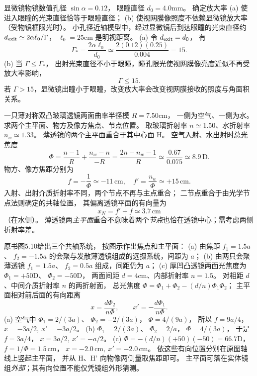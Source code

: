 显微镜物镜数值孔径
$\sin\alpha=0.12$，
眼瞳直径
$d_0=4.0$mm。
确定放大率
(a) 使进入眼瞳的光束直径恰等于眼瞳直径；
(b) 使视网膜像照度不依赖显微镜放大率（受物镜框限光时）。
\exsolution
小孔径近轴模型中，经过显微镜后到达眼瞳的光束直径约
$d_{\rm exit}\simeq2\alpha\ell_0/\Gamma$，
$\ell_0=25$cm 是明视距离。
(a) 令
$d_{\rm exit}=d_0$，
有
\[
\boxed{\Gamma_*=\frac{2\alpha\ell_0}{d_0}
\simeq\frac{2(0.12)(0.25)}{0.004}
=15}.
\]
(b) 当 $\Gamma\le\Gamma_*$，
出射光束直径不小于眼瞳，瞳孔限光使视网膜像亮度近似不再受放大率影响，
\[
\boxed{\Gamma\le15}.
\]
\excheck 若 $\Gamma>15$，显微镜出瞳小于眼瞳，改变放大率会改变视网膜接收的照度与角面积关系。

一只薄对称双凸玻璃透镜两面曲率半径模
$R=7.50$cm，
一侧为空气、一侧为水。
求两个主平面、物方及像方焦点、节点位置。
取玻璃折射率 $n\simeq1.50$、水折射率
$n_w\simeq1.33$。
\exsolution
薄透镜的两个主平面重合于其中心面 H。
空气入射、水出射时总光焦度
\[
\Phi=\frac{n-1}R+\frac{n_w-n}{-R}
=\frac{2n-n_w-1}{R}
\simeq\frac{0.67}{0.075}
\simeq8.9\,\mathrm D.
\]
物方、像方焦距分别为
\[
\boxed{f=-\frac1\Phi\simeq-11\,\mathrm{cm}},
\quad
\boxed{f'=\frac{n_w}{\Phi}\simeq+15\,\mathrm{cm}}.
\]
入射、出射介质折射率不同，两个节点不再与主点重合；
二节点重合于由光学节点法则确定的共轴位置，
其偏离透镜平面的有向量为
\[
\boxed{x_N=f'+f\simeq3.7\,\mathrm{cm}}
\]
（在水侧）。
\excheck 薄透镜两\emph{主平面}重合不意味着两个\emph{节点}也恰在透镜中心；需考虑两侧折射率差。

原书图5.10给出三个共轴系统，
按图示作出焦点和主平面：
(a) 由焦距 $f_1=1.5a$、
$f_2=-1.5a$ 的会聚与发散薄透镜组成的远摄系统，间距为 $a$；
(b) 由两只会聚薄透镜
$f_1=1.5a$、
$f_2=0.5a$ 组成，间距仍为 $a$；
(c) 厚凹凸透镜两面光焦度为
$\Phi_1=+50$D、
$\Phi_2=-50$D，
两面间距 $d=4$cm、内部折射率 $n=1.5$。
\exsolution
对相距 $d$、中间介质折射率 $n$ 的两折射面，
总光焦度
$\Phi=\Phi_1+\Phi_2-(d/n)\Phi_1\Phi_2$；
主平面相对前后面的有向距离
\[
\boxed{x=\frac{d\Phi_2}{n\Phi}},\qquad
\boxed{x'=-\frac{d\Phi_1}{n\Phi}}.
\]
(a) 空气中
$\Phi_1=2/(3a)$、
$\Phi_2=-2/(3a)$，
$\Phi=4/(9a)$，
所以
$\boxed{f=9a/4}$，
$\boxed{x=-3a/2,\ x'=-3a/2}$。
(b)
$\Phi_1=2/(3a)$、
$\Phi_2=2/a$，
$\Phi=4/(3a)$，
于是
$\boxed{f=3a/4}$，
$\boxed{x=3a/2,\ x'=-a/2}$。
(c)
$\Phi=-(d/n)(+50)(-50)=66.7$D，
$\boxed{f=1/\Phi=1.5\,\mathrm{cm}}$，
$\boxed{x=-2.0\,\mathrm{cm},\ x'=-2.0\,\mathrm{cm}}$。
依这些有向位置分别在原图轴线上竖起主平面，
并从 H、H' 向物像两侧量取焦距即可。
\excheck 主平面可落在实体镜组\emph{外部}；其有向位置不能仅凭镜组外形猜测。

